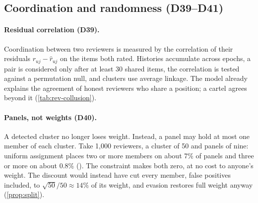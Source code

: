 \subsection{Coordination and randomness (D39--D41)}

\paragraph{Residual correlation (D39).} Coordination between two reviewers is measured by the
correlation of their residuals $r_{uj}-\hat r_{uj}$ on the items both rated. Histories accumulate
across epochs, a pair is considered only after at least 30 shared items, the correlation is tested
against a permutation null, and clusters use average linkage. The model already explains the
agreement of honest reviewers who share a position; a cartel agrees beyond it
(\cref{tab:rev-collusion}).

\begin{table}[t]
\centering\small
\caption{Mean pairwise correlation on a long history (200 reviewers $\times$ 60 items, camps 40/60)
with a cartel of 10 minority-camp members who rate 5 majority-favoured items at $1.0$ plus jitter
$\sigma=0.05$. Last columns: share and number of honest pairs flagged at the threshold that catches
90\% of cartel pairs. Source: \texttt{scripts/revisions\_collusion.py}.}
\label{tab:rev-collusion}
\end{table}

\paragraph{Panels, not weights (D40).} A detected cluster no longer loses weight. Instead, a panel
may hold at most one member of each cluster. Take 1{,}000 reviewers, a cluster of 50 and panels of
nine: uniform assignment places two or more members on about 7\% of panels and three or more on
about 0.8\% (). The constraint makes both zero, at no cost to anyone's
weight. The discount would instead have cut every member, false positives included, to
$\sqrt{50}/50\approx14\%$ of its weight, and evasion restores full weight anyway
(\cref{prop:split}).

